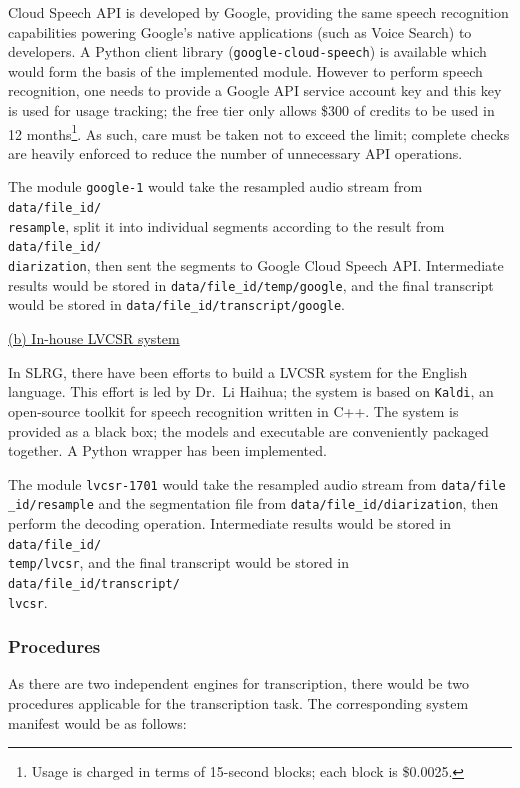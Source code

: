 Cloud Speech API is developed by Google, providing the same speech recognition capabilities powering Google's native applications (such as Voice Search) to developers. A Python client library (\texttt{google-cloud-speech}) is available which would form the basis of the implemented module. However to perform speech recognition, one needs to provide a Google API service account key and this key is used for usage tracking; the free tier only allows \$300 of credits to be used in 12 months\footnote{Usage is charged in terms of 15-second blocks; each block is \$0.0025.}. As such, care must be taken not to exceed the limit; complete checks are heavily enforced to reduce the number of unnecessary API operations.

The module \texttt{google-1} would take the resampled audio stream from \texttt{data/file\_id/\\ resample}, split it into individual segments according to the result from \texttt{data/file\_id/\\diarization}, then sent the segments to Google Cloud Speech API\@. Intermediate results would be stored in \texttt{data/file\_id/temp/google}, and the final transcript would be stored in \texttt{data/file\_id/transcript/google}.

\underline{(b) In-house LVCSR system}

In SLRG, there have been efforts to build a LVCSR system for the English language. This effort is led by Dr.\ Li Haihua; the system is based on \texttt{Kaldi}, an open-source toolkit for speech recognition written in C++. The system is provided as a black box; the models and executable are conveniently packaged together. A Python wrapper has been implemented.

The module \texttt{lvcsr-1701} would take the resampled audio stream from \texttt{data/file\\ \_id/resample} and the segmentation file from \texttt{data/file\_id/diarization}, then perform the decoding operation. Intermediate results would be stored in \texttt{data/file\_id/\\ temp/lvcsr}, and the final transcript would be stored in \texttt{data/file\_id/transcript/\\lvcsr}.

\subsubsection{Procedures}

As there are two independent engines for transcription, there would be two procedures applicable for the transcription task. The corresponding system manifest would be as follows:

